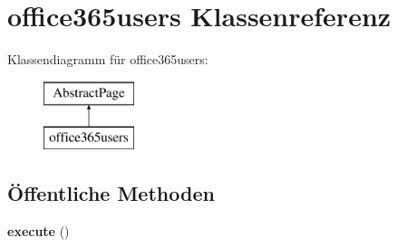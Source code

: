 \hypertarget{classoffice365users}{}\section{office365users Klassenreferenz}
\label{classoffice365users}
Klassendiagramm für office365users\+:\begin{figure}[H]
\begin{center}
\leavevmode
\includegraphics[height=2.000000cm]{classoffice365users}
\end{center}
\end{figure}
\subsection*{Öffentliche Methoden}
\begin{DoxyCompactItemize}
\item 
\mbox{\label{classoffice365users_a3331a9f52fb7acd6d5e17237417cd7c2}} 
{\bfseries execute} ()
\end{DoxyCompactItemize}
